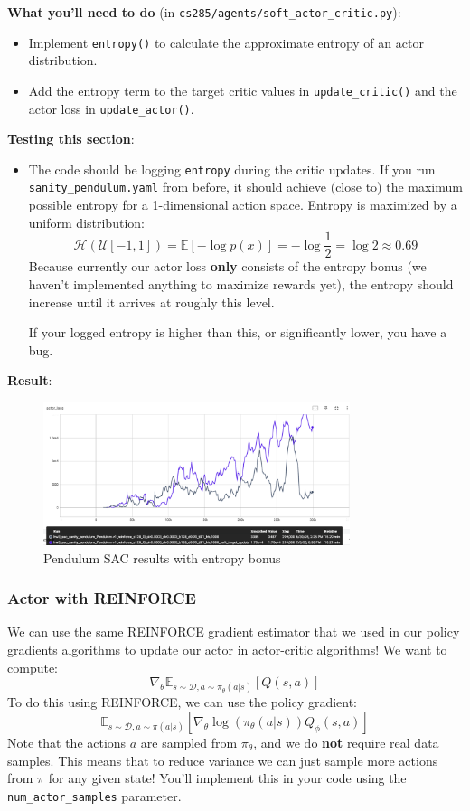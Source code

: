 \textbf{What you'll need to do} (in \verb|cs285/agents/soft_actor_critic.py|):
\begin{itemize}
    \item Implement \verb|entropy()| to calculate the approximate entropy of an actor distribution.
    \item Add the entropy term to the target critic values in \verb|update_critic()| and the actor loss in \verb|update_actor()|.
\end{itemize}

\textbf{Testing this section}:
\begin{itemize}
    \item The code should be logging \verb|entropy| during the critic updates. If you run \verb|sanity_pendulum.yaml| from before, it should achieve (close to) the maximum possible entropy for a 1-dimensional action space. Entropy is maximized by a uniform distribution:
    \[\mathcal{H}(\mathcal{U}[-1, 1]) = \mathbb{E}[-\log p(x)] = -\log \frac{1}{2} = \log 2 \approx 0.69\]
    Because currently our actor loss \textbf{only} consists of the entropy bonus (we haven't implemented anything to maximize rewards yet), the entropy should increase until it arrives at roughly this level.

    If your logged entropy is higher than this, or significantly lower, you have a bug.
\end{itemize}

\textbf{Result}:
\begin{figure}[H]
    \centering
    \includegraphics[width=0.8\textwidth]{imgs/sac/sanity_pendulum_with_soft.png}
    \caption{Pendulum SAC results with entropy bonus}
    \label{fig:pendulum_sac}
\end{figure}

\subsubsection{Actor with REINFORCE}
We can use the same REINFORCE gradient estimator that we used in our policy gradients algorithms to update our actor in actor-critic algorithms! We want to compute:
\[\nabla_\theta\mathbb{E}_{s \sim \mathcal{D}, a \sim \pi_\theta(a|s)}\left[Q(s, a)\right]\]
To do this using REINFORCE, we can use the policy gradient:
\[\mathbb{E}_{s \sim \mathcal{D}, a \sim \pi(a|s)}\left[\nabla_\theta \log(\pi_\theta(a|s))Q_\phi(s, a)\right]\]
Note that the actions $a$ are sampled from $\pi_\theta$, and we do \textbf{not} require real data samples. This means that to reduce variance we can just sample more actions from $\pi$ for any given state! You'll implement this in your code using the \verb|num_actor_samples| parameter.

